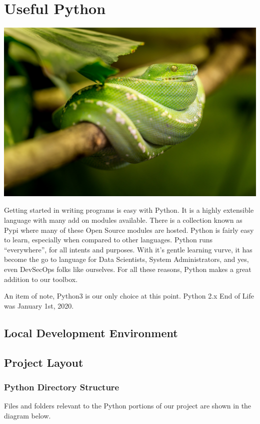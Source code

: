 \chapter{Useful Python}

\includegraphics[scale=0.85]{images/snake-1634293_1920.jpg}

\justify{}
Getting started in writing programs is easy with Python. It is a highly extensible language with many add on modules available. 
There is a collection known as Pypi where many of these Open Source modules are hosted.
Python is fairly easy to learn, especially when compared to other languages. Python runs ``everywhere'', for all intents and
purposes. With it's gentle learning vurve, it has become the go to language for Data Scientists, System Administrators, and yes, even
DevSecOps folks like ourselves. For all these reasons, Python makes a great addition to our toolbox.

\justify{}
An item of note, Python3 is our only choice at this point. Python 2.x End of Life was January 1st, 2020.

\section{Local Development Environment}


\section{Project Layout}

\subsection{Python Directory Structure}
\justify{}
Files and folders relevant to the Python portions of our project are shown in the diagram below.

